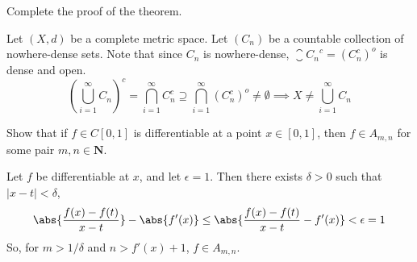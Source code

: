 \begin{exercise}
Complete the proof of the theorem.
\end{exercise}
\begin{solution}
Let \((X,d)\) be a complete metric space. Let \((C_n)\) be a countable collection of nowhere-dense sets. Note that
since \(C_n\) is nowhere-dense, \(\closure{C_n}^c = (C_n^c)^o\) is dense and open.
\[\left(\bigcup^\infty_{i=1} C_n\right)^c = \bigcap^\infty_{i=1} C_n^c \supseteq \bigcap^\infty_{i=1} (C_n^c)^o \neq \emptyset \implies X \neq \bigcup^\infty_{i=1} C_n \]
\end{solution}

\begin{exercise}
Show that if \(f \in C[0,1]\) is differentiable at a point \(x \in [0,1]\), then \(f \in A_{m,n}\) for some pair \(m, n \in \mathbf{N}\).
\end{exercise}
\begin{solution}
Let \(f\) be differentiable at \(x\), and let \(\epsilon = 1\). Then there exists \(\delta > 0\) such that \(|x - t| < \delta\),
\[ \abs{\frac{f(x) - f(t)}{x - t}} - \abs{f'(x)} \leq  \abs{\frac{f(x) - f(t)}{x - t} - f'(x)} < \epsilon = 1\]
So, for \(m > 1/\delta\) and \(n > f'(x) + 1\), \(f \in A_{m,n}\).
\end{solution}

